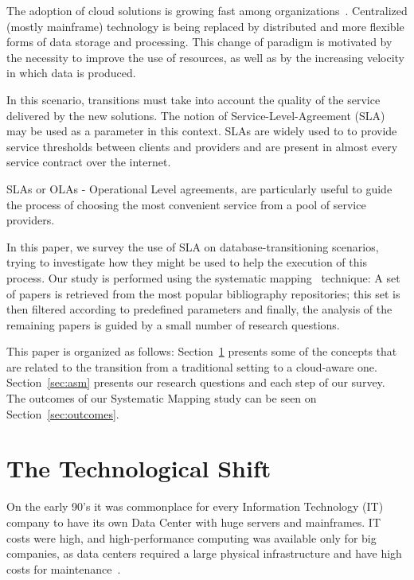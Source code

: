 \documentclass[]{tEIS2e}
\theoremstyle{plain}
\theoremstyle{remark}
\begin{document}
The adoption of cloud solutions is growing fast among organizations~\citep{6546068}.
Centralized (mostly mainframe) technology is being replaced by distributed and more flexible forms of data storage and processing.
This change of paradigm is motivated by the necessity to improve the use of resources, as well as by the increasing velocity in which data is produced.

In this scenario, transitions must take into account the quality of the service delivered by the new solutions.
The notion of Service-Level-Agreement (SLA)~\citep{6253526} may be used as a parameter in this context. SLAs are widely used to to provide service thresholds between clients and providers and are present in almost every service contract over the internet. 

SLAs or OLAs - Operational Level agreements, are particularly useful to guide the process of choosing the most convenient service from a pool of service providers.

In this paper, we survey the use of SLA on database-transitioning scenarios, trying to investigate how they might be used to help the execution of this process.
Our study is performed using the systematic mapping~\citep{Petersen:2008:SMS:2227115.2227123} technique: A set of papers is retrieved from the most popular bibliography repositories; this set is then filtered according to predefined parameters and finally, the analysis of the remaining papers is guided by a small number of research questions.

\bigskip

This paper is organized as follows: 
Section~\ref{sec:tts} presents some of the concepts that are related to the transition from a traditional setting to a cloud-aware one.
Section~\ref{sec:asm} presents our research questions and each step of our survey. The outcomes of our Systematic Mapping study can be seen on Section~\ref{sec:outcomes}.

\section{The Technological Shift}
\label{sec:tts}


On the early 90's it was commonplace for every Information Technology (IT) company to have its own Data Center with huge servers and mainframes. 
IT costs were high, and high-performance computing was available only for big companies, as data centers required a large physical infrastructure and have high costs for maintenance~\citep{Armbrust09m.:above}.
\end{document}
